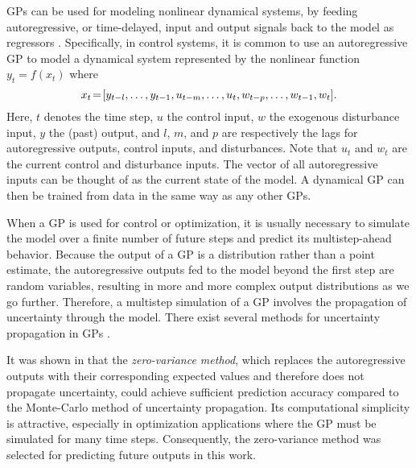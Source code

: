 GPs can be used for modeling nonlinear dynamical systems, by feeding autoregressive, or time-delayed, input and output signals back to the model as regressors \cite{Kocijan2016}.
Specifically, in control systems, it is common to use an autoregressive GP to model a dynamical system represented by the nonlinear function
\begin{math}
y_{t} = f(x_t)
\end{math}
where
\begin{equation*}
x_{t}\!=\![y_{t-l}, \dots, y_{t-1}, u_{t-m}, \dots, u_t, w_{t-p}, \dots, w_{t-1}, w_t] \text.
\end{equation*}
Here, \(t\) denotes the time step, \(u\) the control input, \(w\) the exogenous disturbance input, \(y\) the (past) output, and \(l\), \(m\), and \(p\) are respectively the lags for autoregressive outputs, control inputs, and disturbances.
Note that \(u_t\) and \(w_t\) are the current control and disturbance inputs.
The vector of all autoregressive inputs can be thought of as the current state of the model.
A dynamical GP can then be trained from data in the same way as any other GPs.

When a GP is used for control or optimization, it is usually necessary to simulate the model over a finite number of future steps and predict its multistep-ahead behavior.
Because the output of a GP is a distribution rather than a point estimate, the autoregressive outputs fed to the model beyond the first step are random variables, resulting in more and more complex output distributions as we go further.
Therefore, a multistep simulation of a GP involves the propagation of uncertainty through the model.
There exist several methods for uncertainty propagation in GPs \cite{Kocijan2016}.

It was shown in \cite{nghiemetal16gp} that the \emph{zero-variance method}, which replaces the autoregressive outputs with their corresponding expected values and therefore does not propagate uncertainty, could achieve sufficient prediction accuracy compared to the Monte-Carlo method of uncertainty propagation.
Its computational simplicity is attractive, especially in optimization applications where the GP must be simulated for many time steps.
Consequently, the zero-variance method was selected for predicting future outputs in this work.


